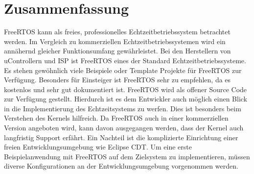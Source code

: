 \section{Zusammenfassung}
FreeRTOS kann als freies, professionelles Echtzeitbetriebssystem betrachtet werden. Im Vergleich zu kommerziellen Echtzeitbetriebssystemen wird ein annähernd gleicher Funktionsumfang gewährleistet. Bei den Herstellern von uControllern und ISP ist FreeRTOS eines der Standard Echtzeitbetriebssysteme. Es stehen gewöhnlich viele Beispiele oder Template Projekte für FreeRTOS zur Verfügung.  Besonders für Einsteiger ist FreeRTOS sehr zu empfehlen, da es kostenlos und sehr gut dokumentiert ist. FreeRTOS wird als offener Source Code zur Verfügung gestellt. Hierdurch ist es dem Entwickler auch möglich einen Blick in die Implementierung des Echtzeitsystems zu werfen. Dies ist besonders beim Verstehen des Kernels hilfreich. Da FreeRTOS auch in einer kommerziellen Version angeboten wird, kann davon ausgegangen werden, dass der Kernel auch langfristig Support erfährt. Ein Nachteil ist die komplizierte Einrichtung einer freien Entwicklungsumgebung wie Eclipse CDT. Um eine erste Beispielanwendung mit FreeRTOS auf dem Zielsystem zu implementieren, müssen diverse Konfigurationen an der Entwicklungsumgebung vorgenommen werden.
